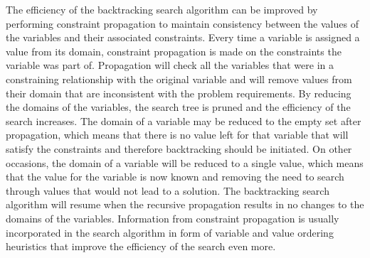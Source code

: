 \documentclass{l4proj}
\begin{document}
\noindent The efficiency of the backtracking search algorithm can be improved by performing constraint propagation to maintain consistency between the values of the variables and their associated constraints. Every time a variable is assigned a value from its domain, constraint propagation is made on the constraints the variable was part of. Propagation will check all the variables that were in a constraining relationship with the original variable and will remove values from their domain that are inconsistent with the problem requirements. By reducing the domains of the variables, the search tree is pruned and the efficiency of the search increases. The domain of a variable may be reduced to the empty set after propagation, which means that there is no value left for that variable that will satisfy the constraints and therefore backtracking should be initiated. On other occasions, the domain of a variable will be reduced to a single value, which means that the value for the variable is now known and removing the need to search through values that would not lead to a solution. The backtracking search algorithm will resume when the recursive propagation results in no changes to the domains of the variables. Information from constraint propagation is usually incorporated in the search algorithm in form of variable and value ordering heuristics that improve the efficiency of the search even more.
\end{document}
